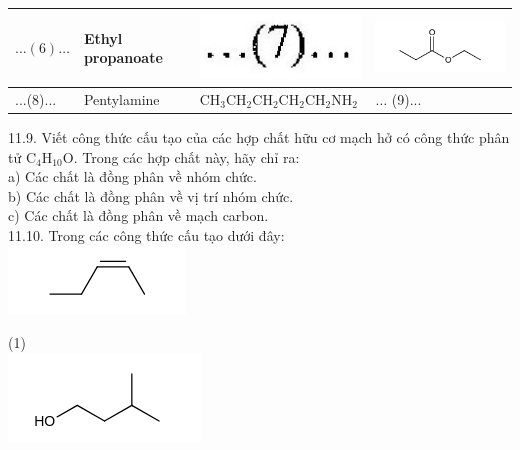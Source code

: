 \documentclass[10pt]{article}
\begin{document}
\begin{center}
\begin{tabular}{|l|l|l|l|}
\hline
$\ldots(6) \ldots$ & Ethyl propanoate & \includegraphics[max width=\textwidth]{2025_10_23_f2823ef970776205e47bg-34(1)}
 & \includegraphics{smile-8e967ac8db62847f9fb82e1befe14ab2c654fc0a} \\
\hline
...(8)... & Pentylamine & $\mathrm{CH}_{3} \mathrm{CH}_{2} \mathrm{CH}_{2} \mathrm{CH}_{2} \mathrm{CH}_{2} \mathrm{NH}_{2}$ & $\ldots$ (9)... \\
\hline
\end{tabular}
\end{center}

11.9. Viết công thức cấu tạo của các hợp chất hữu cơ mạch hở có công thức phân tử $\mathrm{C}_{4} \mathrm{H}_{10} \mathrm{O}$. Trong các hợp chất này, hãy chỉ ra:\\
a) Các chất là đồng phân về nhóm chức.\\
b) Các chất là đồng phân về vị trí nhóm chức.\\
c) Các chất là đồng phân về mạch carbon.\\
11.10. Trong các công thức cấu tạo dưới đây:\\
\includegraphics{smile-71f6c89f7bd7f7deee83e522e694f2b96a8b3e46}

(1)\\
\includegraphics{smile-0eee30f118834fe0e15d7279ba8f506929f01d33}
\end{document}
